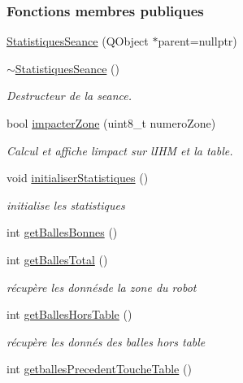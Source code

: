 \subsubsection*{Fonctions membres publiques}
\begin{DoxyCompactItemize}
\item 
\hyperlink{class_statistiques_seance_ab4096821bf4cb5fbebcf895b1a70be42}{Statistiques\+Seance} (Q\+Object $\ast$parent=nullptr)
\item 
\hyperlink{class_statistiques_seance_a2e84d125a8d696fa74d9c356eb2b8cab}{$\sim$\+Statistiques\+Seance} ()
\begin{DoxyCompactList}\small\item\em Destructeur de la seance. \end{DoxyCompactList}\item 
bool \hyperlink{class_statistiques_seance_adf93738ca1b6b117ac91b68772d2c4c8}{impacter\+Zone} (uint8\+\_\+t numero\+Zone)
\begin{DoxyCompactList}\small\item\em Calcul et affiche l\textquotesingle{}impact sur l\textquotesingle{}I\+HM et la table. \end{DoxyCompactList}\item 
void \hyperlink{class_statistiques_seance_a17e1c49e2986a8490ff96e4bd7733291}{initialiser\+Statistiques} ()
\begin{DoxyCompactList}\small\item\em initialise les statistiques \end{DoxyCompactList}\item 
int \hyperlink{class_statistiques_seance_a0dad2ceb22672adf343548b35bf86ba1}{get\+Balles\+Bonnes} ()
\item 
int \hyperlink{class_statistiques_seance_aaefd0b775012ec914a36a262dc14fc66}{get\+Balles\+Total} ()
\begin{DoxyCompactList}\small\item\em récupère les donnésde la zone du robot \end{DoxyCompactList}\item 
int \hyperlink{class_statistiques_seance_a26b717d40065e7afd80465458f3cb6aa}{get\+Balles\+Hors\+Table} ()
\begin{DoxyCompactList}\small\item\em récupère les donnés des balles hors table \end{DoxyCompactList}\item 
int \hyperlink{class_statistiques_seance_a4f0dc4fd1c97787dab03ae5074fb3414}{getballes\+Precedent\+Touche\+Table} ()

\end{DoxyCompactItemize}

